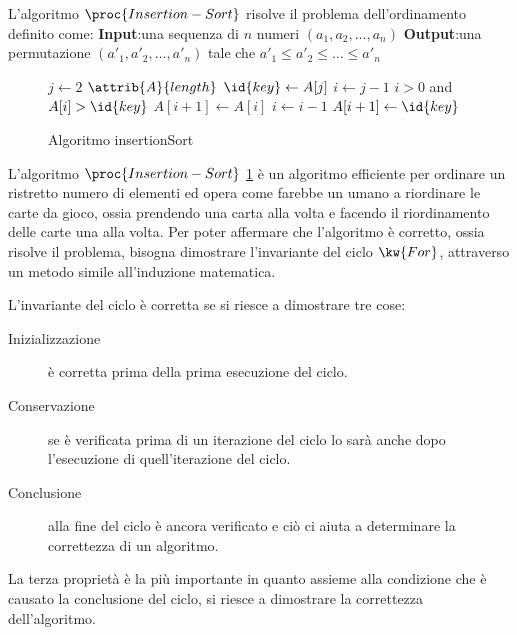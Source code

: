 L'algoritmo $\proc{Insertion-Sort}$ risolve il problema dell'ordinamento definito come:\newline
\textbf{Input}:una sequenza di $n$ numeri $(a_1,a_2,\dots,a_n)$ \newline
\textbf{Output}:una permutazione $(a'_1,a'_2,\dots,a'_n)$ tale che $a'_1 \leq a'_2 \leq \dots \leq a'_n$

\begin{figure}
    \caption{Algoritmo insertionSort}
    \label{alg:insertion}
    \begin{codebox}
        \li \For $j \gets 2$ \To $\attrib{A}{length}$
            \Do
        \li            $\id{key} \gets A[j]$
        \li         $i \gets j-1$
        \li         \While $i > 0$ and $A[i] > \id{key}$
                    \Do
        \li                $A[i+1] \gets A[i]$
        \li                $i \gets i-1$
                    \End
        \li         $A[i+1] \gets \id{key}$
            \End
    \end{codebox}
\end{figure}
L'algoritmo $\proc{Insertion-Sort}$ \ref{alg:insertion} è un algoritmo efficiente per ordinare un ristretto numero di elementi ed opera come farebbe un umano
a riordinare le carte da gioco, ossia prendendo una carta alla volta e facendo il riordinamento delle carte una alla volta.\newline
Per poter affermare che l'algoritmo è corretto, ossia risolve il problema, bisogna dimostrare l'invariante del ciclo $\kw{For}$, attraverso un metodo simile all'induzione matematica.

L'invariante del ciclo è corretta se si riesce a dimostrare tre cose:
\begin{description}
  \item[Inizializzazione] è corretta prima della prima esecuzione del ciclo.
  \item[Conservazione] se è verificata prima di un iterazione del ciclo lo sarà anche dopo l'esecuzione di quell'iterazione del ciclo.
  \item[Conclusione] alla fine del ciclo è ancora verificato e ciò ci aiuta a determinare la correttezza di un algoritmo.
\end{description}
La terza proprietà è la più importante in quanto assieme alla condizione che è causato la conclusione del ciclo, si riesce a dimostrare la correttezza dell'algoritmo.

